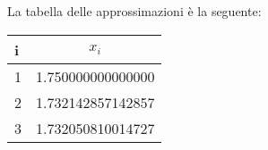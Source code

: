 

La tabella delle approssimazioni è la seguente:
\begin{tabular}{lc}
i & \( x_i \) \\
\hline
1 & 1.750000000000000 \\
2 & 1.732142857142857 \\
3 & 1.732050810014727 \\
\end{tabular}\\

